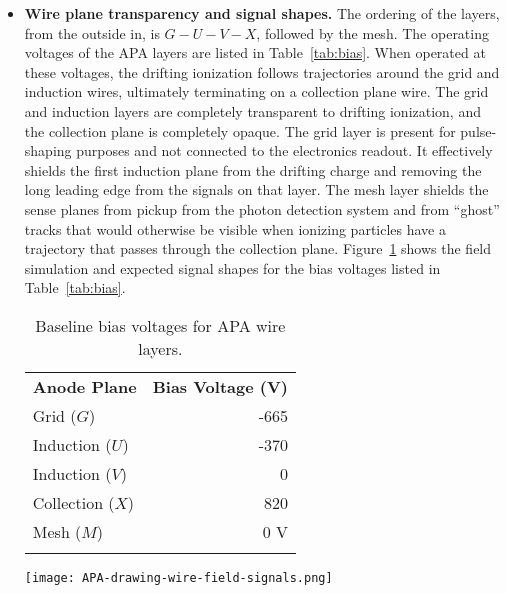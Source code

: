 \begin{itemize}
\begin{dunefigure}{fig:e-gamma}{Summary of electron-$\gamma$ separation performance studies from the DUNE Far Detector Task Force (figures from DUNE-docdb-3384). (a): $e-\gamma$ separation by $dE/dx$ for the nominal wire spacing and angle (\SI{5}{mm}/$37.5^\circ$) compared to \SI{3}{mm} spacing or $45^\circ$ induction wire angles. (b) Electron signal selection efficiency versus photon (background) rejection for the different detector configurations.}
(a)
\texttt{[image: dEdx.pdf]} \qquad
(b)
\texttt{[image: eff-bkgd-wires.pdf]} 
\end{dunefigure}

\item \textbf{Wire plane transparency and signal shapes.}  The ordering of the layers, from the outside in, is $G-U-V-X$, followed by the mesh. The operating voltages of the APA layers are listed in Table~\ref{tab:bias}.  When operated at these voltages, the drifting ionization follows trajectories around the grid and induction wires, ultimately terminating on a collection plane wire. The grid and induction layers are completely transparent to drifting ionization, and the collection plane is completely opaque.  The grid layer is present for pulse-shaping purposes and not connected to the electronics readout. It effectively shields the first induction plane from the drifting charge and removing the long leading edge from the signals on that layer. The mesh layer shields the sense planes from pickup from the photon detection system and from ``ghost'' tracks that would otherwise be visible when ionizing particles have a trajectory that passes through the collection plane. Figure~\ref{fig:apa-fields} shows the field simulation and expected signal shapes for the bias voltages listed in Table~\ref{tab:bias}.

\begin{table}[ht]
\begin{minipage}[b]{0.46\linewidth}
\centering
\begin{tabular}{ l  r }
    \hline
    \textbf{Anode Plane} & \textbf{Bias Voltage (V)} \\ \toprowrule
	Grid ($G$) & -665 \\ \colhline
	Induction ($U$) & -370 \\ \colhline
	Induction ($V$) & 0 \\ \colhline
	Collection ($X$) & 820 \\ \colhline
	Mesh ($M$) & 0 V\\ \colhline
    \end{tabular}
    \caption{Baseline bias voltages for APA wire layers.}
    \label{tab:bias}
\end{minipage}\hfill
\begin{minipage}[t]{0.5\linewidth}
\centering
\texttt{[image: APA-drawing-wire-field-signals.png]}
\label{fig:apa-fields}
\end{minipage}
\end{table}


\end{itemize}
